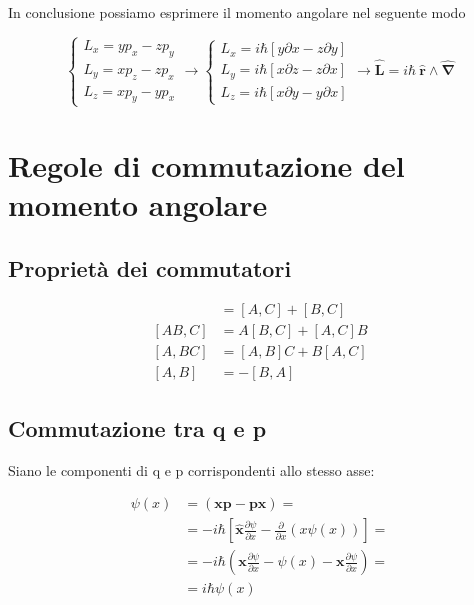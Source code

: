 In conclusione possiamo esprimere il momento angolare nel seguente modo


\begin{equation}
\left\{\begin{array}{ccc}

L_x= y p_x - z p_y \\
L_y= x p_z - z p_x \\
L_z= x p_y - y p_x

\end{array}\right. 
\rightarrow
\left\{\begin{array}{ccc}

L_x= i\hbar[y \partial x - z \partial y]\\
L_y= i\hbar[x \partial z - z \partial x] \\
L_z= i\hbar[x \partial y - y \partial x]
\end{array}\right. 
\rightarrow \mathbf{\hat L} = i \hbar \: \mathbf{\hat r} \wedge \mathbf{\hat \nabla}
\end{equation}

\newpage

\section{Regole di commutazione del momento angolare}

\subsection{Proprietà dei commutatori}

\begin{align}
[A + B, C] &= [A,C] + [B,C] \\
[AB,C] &= A[B,C] + [A,C]B \\
[A,BC] &= [A,B]C + B[A,C] \\
[A,B] &= -[B,A]
\end{align}

\subsection{Commutazione tra q e p}

Siano le componenti di q e p corrispondenti allo stesso asse:

\begin{align}
[\mathbf{x}, \mathbf{p_x}]\psi(x) {}&= (\mathbf{x}\mathbf{p} - \mathbf{p}\mathbf{x}) = \nonumber \\ 
& = -i \hbar \left[
\mathbf{\hat x} \frac{\partial \psi}{\partial x} - \frac{\partial }{\partial x}(x \psi(x))
\right]=  \nonumber \\
&=  -i \hbar \left(
\mathbf{x} \frac{\partial \psi}{\partial x} - \psi(x) - \mathbf{x} \frac{\partial \psi}{\partial x}
\right)=  \nonumber \\
&= i \hbar \psi(x)
\end{align}

